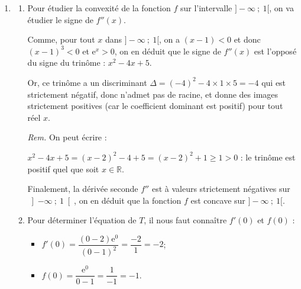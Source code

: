 \documentclass[10pt]{article}
\providecommand{\R}{\mathbb{R}}
\providecommand{\e}{{\mathrm{e}}}
\begin{document}
\begin{enumerate}
\begin{enumerate}
$x - 2 \geqslant 0 \iff x \geqslant 2$, donc sur $ ]-\infty ~;~ 1[ $, $(x-2)$ est  strictement négatif, donc $f'(x)$ également.

Finalement, on peut donc en déduire que $f$ est strictement décroissante sur $]-\infty ~;~ 1[$, et donc, on a le tableau de variations suivant (avec les limites justifiées aux questions \textbf{1. a.} et \textbf{2.}):

\begin{center}
\end{center}
	\end{enumerate}

\item \begin{enumerate}
		\item Pour étudier la convexité de la fonction $f$ sur l'intervalle $]-\infty~;~1[$, on va étudier le signe de $f''(x)$.

		Comme, pour tout $x$ dans $ ]-\infty ~;~1[ $, on a $(x - 1) < 0$ et donc $(x - 1)^3 < 0$ et $\e^{x} > 0$, on en déduit que le signe de $f''(x)$ est l'opposé du signe du trinôme : $x^2 - 4x + 5$.

Or, ce trinôme a un discriminant $\Delta = (-4)^2 - 4 \times 1 \times 5 = -4 $ qui est strictement négatif, donc n'admet pas de racine, et donne des images strictement positives (car le coefficient dominant est positif) pour tout réel $x$.

\emph{Rem.} On peut écrire :

$x^2 - 4x + 5 = (x - 2)^2 - 4 + 5 = (x - 2)^2 + 1 \geqslant 1 > 0$ : le trinôme est positif quel que soit $x \in \R$.

Finalement, la dérivée seconde $f''$ est à valeurs strictement négatives sur $\left]-\infty ~;~ 1\right[$, on en déduit que la fonction $f$ est concave sur $]-\infty ~;~ 1[$.

		\item Pour déterminer l'équation de $T$, il nous faut connaître $f'(0)$ et $f(0)$ :

\begin{itemize}[left=5mm]
\item $f'(0) = \dfrac{(0 - 2)\e^{0}}{(0 - 1)^2} = \dfrac{-2}{1} = -2$;
\item $f(0) = \dfrac{\e^0}{0 - 1} = \dfrac{1}{-1} = -1$.
\end{itemize}


\end{enumerate}
\end{enumerate}
\end{document}
